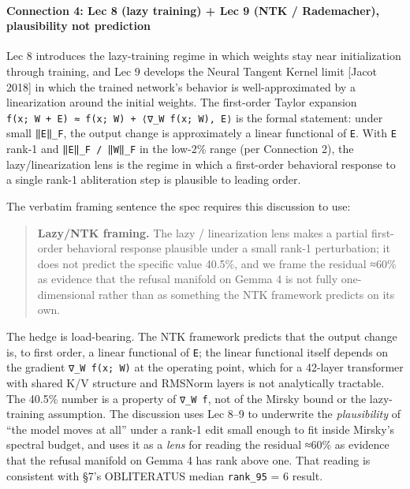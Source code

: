 \documentclass[
  11pt,
]{article}
\begin{document}
\paragraph{Connection 4: Lec 8 (lazy training) + Lec 9 (NTK /
Rademacher), plausibility not
prediction}\label{connection-4-lec-8-lazy-training-lec-9-ntk-rademacher-plausibility-not-prediction}

Lec 8 introduces the lazy-training regime in which weights stay near
initialization through training, and Lec 9 develops the Neural Tangent
Kernel limit {[}Jacot 2018{]} in which the trained network's behavior is
well-approximated by a linearization around the initial weights. The
first-order Taylor expansion
\texttt{f(x;\ W\ +\ E)\ ≈\ f(x;\ W)\ +\ ⟨∇\_W\ f(x;\ W),\ E⟩} is the
formal statement: under small \texttt{‖E‖\_F}, the output change is
approximately a linear functional of \texttt{E}. With \texttt{E} rank-1
and \texttt{‖E‖\_F\ /\ ‖W‖\_F} in the low-2\% range (per Connection 2),
the lazy/linearization lens is the regime in which a first-order
behavioral response to a single rank-1 abliteration step is plausible to
leading order.

The verbatim framing sentence the spec requires this discussion to use:

\begin{quote}
\textbf{Lazy/NTK framing.} The lazy / linearization lens makes a partial
first-order behavioral response plausible under a small rank-1
perturbation; it does not predict the specific value 40.5\%, and we
frame the residual ≈60\% as evidence that the refusal manifold on Gemma
4 is not fully one-dimensional rather than as something the NTK
framework predicts on its own.
\end{quote}

The hedge is load-bearing. The NTK framework predicts that the output
change is, to first order, a linear functional of \texttt{E}; the linear
functional itself depends on the gradient \texttt{∇\_W\ f(x;\ W)} at the
operating point, which for a 42-layer transformer with shared K/V
structure and RMSNorm layers is not analytically tractable. The 40.5\%
number is a property of \texttt{∇\_W\ f}, not of the Mirsky bound or the
lazy-training assumption. The discussion uses Lec 8--9 to underwrite the
\emph{plausibility} of ``the model moves at all'' under a rank-1 edit
small enough to fit inside Mirsky's spectral budget, and uses it as a
\emph{lens} for reading the residual ≈60\% as evidence that the refusal
manifold on Gemma 4 has rank above one. That reading is consistent with
§7's OBLITERATUS median \texttt{rank\_95} = 6 result.
\end{document}
